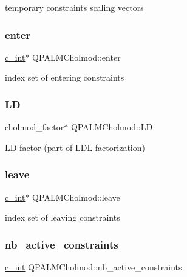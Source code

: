 temporary constraints scaling vectors 

\mbox{\label{structQPALMCholmod_aa8b56653cf6a253c025c7430b112d4ee}} 
\subsubsection{\texorpdfstring{enter}{enter}}
{\footnotesize\ttfamily \mbox{\hyperlink{global__opts_8h_aa3217a0f49d3e52b74e9dd830c44472f}{c\+\_\+int}}$\ast$ Q\+P\+A\+L\+M\+Cholmod\+::enter}



index set of entering constraints 

\mbox{\label{structQPALMCholmod_aa13c04a0c6d42ce03f4ed35facecdb17}} 
\subsubsection{\texorpdfstring{LD}{LD}}
{\footnotesize\ttfamily cholmod\+\_\+factor$\ast$ Q\+P\+A\+L\+M\+Cholmod\+::\+LD}



LD factor (part of L\+DL\textquotesingle{} factorization) 

\mbox{\label{structQPALMCholmod_a9b386126a4e4d1773152c32e40cb7ccf}} 
\subsubsection{\texorpdfstring{leave}{leave}}
{\footnotesize\ttfamily \mbox{\hyperlink{global__opts_8h_aa3217a0f49d3e52b74e9dd830c44472f}{c\+\_\+int}}$\ast$ Q\+P\+A\+L\+M\+Cholmod\+::leave}



index set of leaving constraints 

\mbox{\label{structQPALMCholmod_ad36c8474bed45333464cf3d877e783c5}} 
\subsubsection{\texorpdfstring{nb\_active\_constraints}{nb\_active\_constraints}}
{\footnotesize\ttfamily \mbox{\hyperlink{global__opts_8h_aa3217a0f49d3e52b74e9dd830c44472f}{c\+\_\+int}} Q\+P\+A\+L\+M\+Cholmod\+::nb\+\_\+active\+\_\+constraints}




